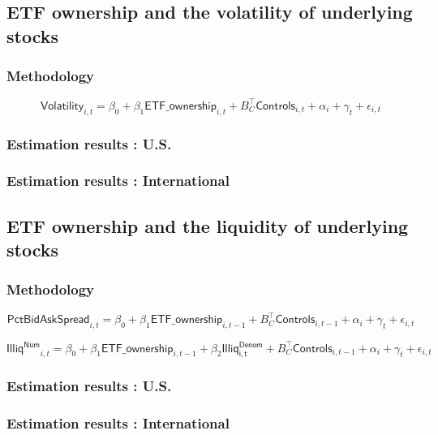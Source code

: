 \documentclass[9pt, usenames, dvipsnames]{beamer}
\begin{document}
\subsection{ETF ownership and the volatility of underlying stocks}
\begin{frame}
  \frametitle{Methodology}
\begin{equation}
  \mathsf{Volatility}_{i,t} = \beta_{0} + \beta_{1} \mathsf{ETF\_ownership}_{i, t} + B_{C}^{\intercal} \mathsf{Controls}_{i, t} + \alpha_{i} + \gamma_{t} + \epsilon_{i, t}
\end{equation}
  
\end{frame}

\begin{frame}
  \frametitle{Estimation results : U.S.}
  \centering
  
\end{frame}

\begin{frame}
  \frametitle{Estimation results : International}
  \centering
  
\end{frame}

\subsection{ETF ownership and the liquidity of underlying stocks}
\begin{frame}
  \frametitle{Methodology}
  \begin{equation}
 \mathsf{PctBidAskSpread}_{i,t} = \beta_{0} + \beta_{1} \mathsf{ETF\_ownership}_{i, t - 1} + B_{C}^{\intercal} \mathsf{Controls}_{i, t - 1} + \alpha_{i} + \gamma_{t} + \epsilon_{i, t}
  \end{equation}

  \begin{equation}
   \mathsf{Illiq^{Num}}_{i,t} = \beta_{0} + \beta_{1} \mathsf{ETF\_ownership}_{i, t - 1} + \beta_{2} \mathsf{Illiq^{Denom}_{i,t}} + B_{C}^{\intercal} \mathsf{Controls}_{i, t- 1} + \alpha_{i} + \gamma_{t} + \epsilon_{i, t}
\end{equation}

\end{frame}

\begin{frame}
  \frametitle{Estimation results : U.S.}
  \centering
  
\end{frame}

\begin{frame}
  \frametitle{Estimation results : International}
  \centering
  
\end{frame}
\end{document}
